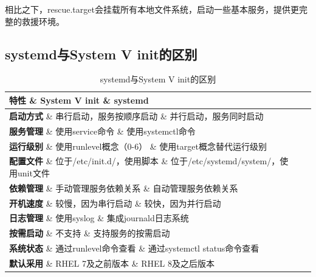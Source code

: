 \documentclass[12pt,UTF8]{ctexbook}
\begin{document}
相比之下，rescue.target会挂载所有本地文件系统，启动一些基本服务，提供更完整的救援环境。

\subsection{systemd与System V init的区别}
\begin{table}[htbp]
    \centering
    \begin{tabularx}{\textwidth}{|X|X|X|}
        \hline
        \textbf{特性} \& \textbf{System V init} \& \textbf{systemd} \\
        \hline
        \textbf{启动方式} \& 串行启动，服务按顺序启动 \& 并行启动，服务同时启动 \\
        \hline
        \textbf{服务管理} \& 使用service命令 \& 使用systemctl命令 \\
        \hline
        \textbf{运行级别} \& 使用runlevel概念（0-6） \& 使用target概念替代运行级别 \\
        \hline
        \textbf{配置文件} \& 位于/etc/init.d/，使用脚本 \& 位于/etc/systemd/system/，使用unit文件 \\
        \hline
        \textbf{依赖管理} \& 手动管理服务依赖关系 \& 自动管理服务依赖关系 \\
        \hline
        \textbf{开机速度} \& 较慢，因为串行启动 \& 较快，因为并行启动 \\
        \hline
        \textbf{日志管理} \& 使用syslog \& 集成journald日志系统 \\
        \hline
        \textbf{按需启动} \& 不支持 \& 支持服务的按需启动 \\
        \hline
        \textbf{系统状态} \& 通过runlevel命令查看 \& 通过systemctl status命令查看 \\
        \hline
        \textbf{默认采用} \& RHEL 7及之前版本 \& RHEL 8及之后版本 \\
        \hline
    \end{tabularx}
    \caption{systemd与System V init的区别}
    \label{tab:systemd\_vs\_sysvinit}
\end{table}
\end{document}

